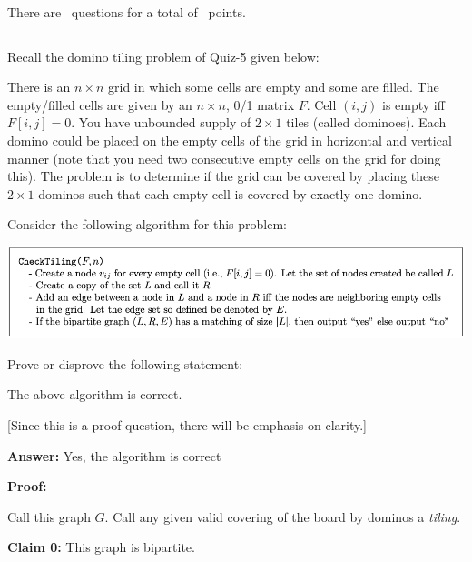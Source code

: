 \documentclass[answers]{exam}
\begin{document}
\vspace{0.1in}


\vspace{0.1in}
There are \numquestions\, questions for a total of \numpoints\, points.
\vspace{0.1in}
\hrule
 \vspace{0.2in}
\begin{questions}
 
\question[5] 

Recall the domino tiling problem of Quiz-5 given below:

    There is an $n \times n$ grid in which some cells are empty and some are filled. The empty/filled cells are given by an $n \times n$, 0/1 matrix $F$. Cell $(i, j)$ is empty iff $F[i, j] = 0$. You
    have unbounded supply of $2 \times 1$ tiles (called dominoes). Each domino could be placed on the empty cells of the grid in horizontal and vertical manner (note that you need two consecutive
    empty cells on the grid for doing this). The problem is to determine if the grid can be covered by placing these $2 \times 1$ dominos such that each empty cell is covered by exactly one domino. 

Consider the following algorithm for this problem:

    \begin{center}
        \includegraphics{major/Tiling-algo.png}
    \end{center}

Prove or disprove the following statement:

    The above algorithm is correct.

[Since this is a proof question, there will be emphasis on clarity.]

    \begin{solution}

        \textbf{Answer:} Yes, the algorithm is correct

        \textbf{Proof:}

Call this graph $G$. Call any given valid covering of the board by dominos a \textit{tiling}.

        \textbf{Claim 0:} This graph is bipartite.
        

\end{solution}
\end{questions}
\end{document}
